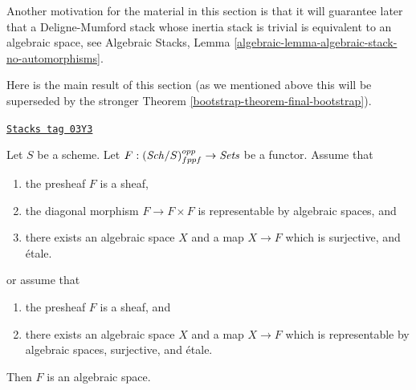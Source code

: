 \medskip\noindent
Another motivation for the material in this section is that it will guarantee
later that a Deligne-Mumford stack whose inertia stack is trivial is equivalent
to an algebraic space, see
Algebraic Stacks, Lemma \ref{algebraic-lemma-algebraic-stack-no-automorphisms}.

\medskip\noindent
Here is the main result of this section (as we mentioned above this
will be superseded by the stronger
Theorem \ref{bootstrap-theorem-final-bootstrap}).

\begin{theorem}[Bootstrap]
\label{bootstrap-theorem-bootstrap}
\href{https://stacks.math.columbia.edu/tag/03Y3}{\texttt{Stacks tag 03Y3}}

Let $S$ be a scheme.
Let $F : (\mathit{Sch}/S)_{fppf}^{opp} \to \textit{Sets}$ be a functor.
Assume that
\begin{enumerate}
\item the presheaf $F$ is a sheaf,
\item the diagonal morphism $F  \to F \times F$ is representable by
algebraic spaces, and
\item there exists an algebraic space $X$
and a map $X \to F$ which is surjective, and \'etale.
\end{enumerate}
or assume that
\begin{enumerate}
\item[(a)] the presheaf $F$ is a sheaf, and
\item[(b)] there exists an algebraic space $X$ and a map $X \to F$
which is representable by algebraic spaces, surjective, and \'etale.
\end{enumerate}
Then $F$ is an algebraic space.
\end{theorem}

